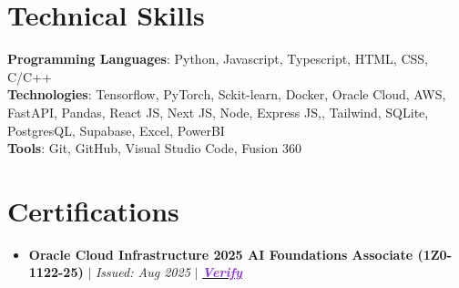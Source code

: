 \documentclass[a4paper,11pt]{article}
\newcommand{\resumeItem}[1]{
  \item\small{
    {#1 \vspace{-2pt}}
  }
}
\newcommand{\resumeItemListStart}{\begin{itemize}[leftmargin=0.15in, nosep]}
\newcommand{\resumeItemListEnd}{\end{itemize}\vspace{-2pt}}
\begin{document}
\vspace{-10pt}
\section{\Large{Technical Skills}}
 \begin{itemize}[leftmargin=0.15in, label={}]
    \small{\item{
     \textbf{Programming Languages}{: Python, Javascript, Typescript, HTML, CSS, C/C++} \\
     \textbf{Technologies}{: Tensorflow, PyTorch, Sckit-learn, Docker, Oracle Cloud, AWS, FastAPI, Pandas, React JS, Next JS, Node, Express JS,, Tailwind, SQLite, PostgresQL, Supabase, Excel, PowerBI}  \\
     \textbf{Tools}{: Git, GitHub, Visual Studio Code, Fusion 360} \\
    }}
 \end{itemize}

\vspace{-12pt}
\section{Certifications}
  \resumeItemListStart
    \resumeItem{\textbf{Oracle Cloud Infrastructure 2025 AI Foundations Associate (1Z0-1122-25)} $|$ \emph{Issued: Aug 2025} $|$ \emph{\href{https://catalog-education.oracle.com/ords/certview/sharebadge?id=82DB04BF7EB36ECBDCA3D64DA0C3B78B4FB0EE3FA8CCDFA68535B8FD8F7AC230}{\textcolor{BlueViolet}{\textbf{Verify}}}}}
  \resumeItemListEnd
\end{document}
